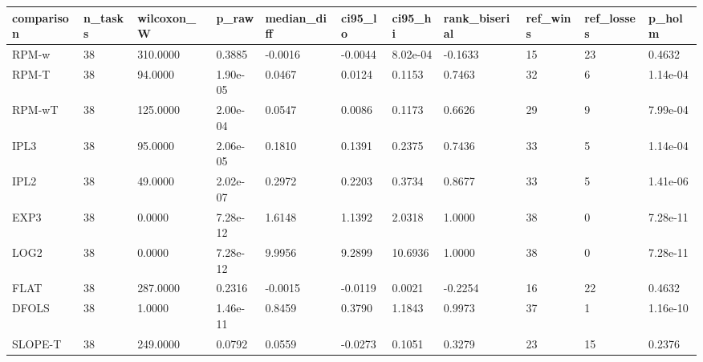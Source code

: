 \begin{tabular}{lllllllllll}
\hline
comparison & n\_tasks & wilcoxon\_W & p\_raw & median\_diff & ci95\_lo & ci95\_hi & rank\_biserial & ref\_wins & ref\_losses & p\_holm \\
\hline
RPM-w & 38 & 310.0000 & 0.3885 & -0.0016 & -0.0044 & 8.02e-04 & -0.1633 & 15 & 23 & 0.4632 \\
RPM-T & 38 & 94.0000 & 1.90e-05 & 0.0467 & 0.0124 & 0.1153 & 0.7463 & 32 & 6 & 1.14e-04 \\
RPM-wT & 38 & 125.0000 & 2.00e-04 & 0.0547 & 0.0086 & 0.1173 & 0.6626 & 29 & 9 & 7.99e-04 \\
IPL3 & 38 & 95.0000 & 2.06e-05 & 0.1810 & 0.1391 & 0.2375 & 0.7436 & 33 & 5 & 1.14e-04 \\
IPL2 & 38 & 49.0000 & 2.02e-07 & 0.2972 & 0.2203 & 0.3734 & 0.8677 & 33 & 5 & 1.41e-06 \\
EXP3 & 38 & 0.0000 & 7.28e-12 & 1.6148 & 1.1392 & 2.0318 & 1.0000 & 38 & 0 & 7.28e-11 \\
LOG2 & 38 & 0.0000 & 7.28e-12 & 9.9956 & 9.2899 & 10.6936 & 1.0000 & 38 & 0 & 7.28e-11 \\
FLAT & 38 & 287.0000 & 0.2316 & -0.0015 & -0.0119 & 0.0021 & -0.2254 & 16 & 22 & 0.4632 \\
DFOLS & 38 & 1.0000 & 1.46e-11 & 0.8459 & 0.3790 & 1.1843 & 0.9973 & 37 & 1 & 1.16e-10 \\
SLOPE-T & 38 & 249.0000 & 0.0792 & 0.0559 & -0.0273 & 0.1051 & 0.3279 & 23 & 15 & 0.2376 \\
\hline
\end{tabular}

